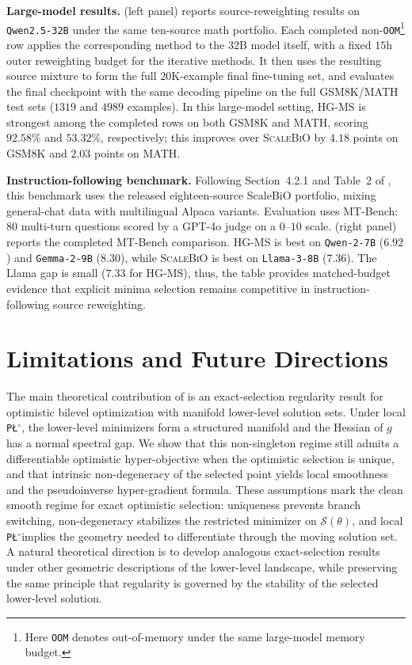 \documentclass{article}
\theoremstyle{normaltheorem}
\newcommand{\PLcirc}{\texttt{P\L$^\circ$}}
\newcommand{\calS}{\mathcal{S}}
\begin{document}
\textbf{Large-model results.}
 (left panel) reports source-reweighting results on \texttt{Qwen2.5-32B} under the same ten-source math portfolio. Each completed non-\texttt{OOM}\footnote{Here \texttt{OOM} denotes out-of-memory under the same large-model memory budget.
} row applies the corresponding method to the 32B model itself, with a fixed \(15\)h outer reweighting budget for the iterative methods. It then uses the resulting source mixture to form the full \(20\)K-example final fine-tuning set, and evaluates the final checkpoint with the same decoding pipeline on the full GSM8K/MATH test sets (\(1319\) and \(4989\) examples). In this large-model setting, \textsc{HG-MS} is strongest among the completed rows on both GSM8K and MATH, scoring \(92.58\%\) and \(53.32\%\), respectively; this improves over \textsc{ScaleBiO} by \(4.18\) points on GSM8K and \(2.03\) points on MATH.

\textbf{Instruction-following benchmark.}
Following Section~4.2.1 and Table~2 of \citet{pan2025scalebio}, this benchmark uses the released eighteen-source ScaleBiO portfolio, mixing general-chat data with multilingual Alpaca variants. Evaluation uses MT-Bench: $80$ multi-turn questions scored by a GPT-4o judge on a $0$--$10$ scale.
 (right panel) reports the completed MT-Bench comparison. \textsc{HG-MS} is best on \texttt{Qwen-2-7B} ($6.92$) and \texttt{Gemma-2-9B} ($8.30$), while \textsc{ScaleBiO} is best on \texttt{Llama-3-8B} ($7.36$). The Llama gap is small ($7.33$ for \textsc{HG-MS}), thus, the table provides matched-budget evidence that explicit minima selection remains competitive in instruction-following source reweighting.

\section{Limitations and Future Directions}\label{sec:limitations-future}
The main theoretical contribution of  is an exact-selection regularity result for optimistic bilevel
optimization with manifold lower-level solution sets. Under local \PLcirc, the lower-level minimizers form a structured
manifold and the Hessian of \(g\) has a normal spectral gap. We show that this non-singleton regime still admits a
differentiable optimistic hyper-objective when the optimistic selection is unique, and that intrinsic non-degeneracy of the
selected point yields local smoothness and the pseudoinverse hyper-gradient formula. These assumptions mark the clean
smooth regime for exact optimistic selection: uniqueness prevents branch switching, non-degeneracy stabilizes the
restricted minimizer on \(\calS(\theta)\), and local \PLcirc implies the geometry needed to differentiate through the
moving solution set. A natural theoretical direction is to develop analogous exact-selection results under other
geometric descriptions of the lower-level landscape, while preserving the same principle that regularity is governed by
the stability of the selected lower-level solution.
\end{document}
